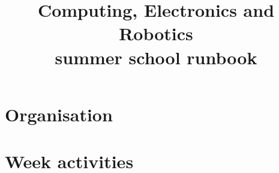 \documentclass[a4paper]{report}
\title{Computing, Electronics and Robotics \\ summer school runbook}
\begin{document}
\maketitle

\tableofcontents
\clearpage
\listoffigures
\clearpage
\listoftables
\clearpage
\listoftask
\clearpage


\chapter{Organisation}



\chapter{Week activities}


\end{document}
